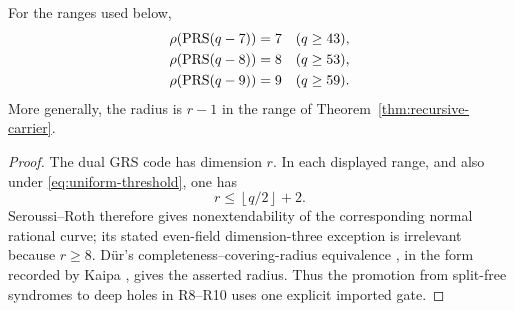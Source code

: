 \begin{proposition}\label{prop:upper-radius}%
%
%
For the ranges used below,
\[
\begin{aligned}
 \rho(\operatorname{PRS}(q-7))&=7 &&(q\geq43),\\
 \rho(\operatorname{PRS}(q-8))&=8 &&(q\geq53),\\
 \rho(\operatorname{PRS}(q-9))&=9 &&(q\geq59).
\end{aligned}
\]
More generally, the radius is \(r-1\) in the range of
Theorem~\ref{thm:recursive-carrier}.
\end{proposition}

\begin{proof}
The dual GRS code has dimension \(r\).  In each displayed range, and also
under \eqref{eq:uniform-threshold}, one has
\[
                         r\leq\left\lfloor q/2\right\rfloor+2.
\]
Seroussi--Roth \cite[Thm.~1]{SeroussiRoth1986} therefore gives
nonextendability of the corresponding normal rational curve; its stated
even-field dimension-three exception is irrelevant because \(r\geq8\).
Dür's completeness--covering-radius equivalence \cite{Dur1994}, in the
form recorded by Kaipa \cite[Sec.~IV and Prop.~4(1)]{Kaipa2017}, gives
the asserted radius.  Thus the promotion from split-free syndromes to deep
holes in R8--R10 uses one explicit imported gate.
\end{proof}
